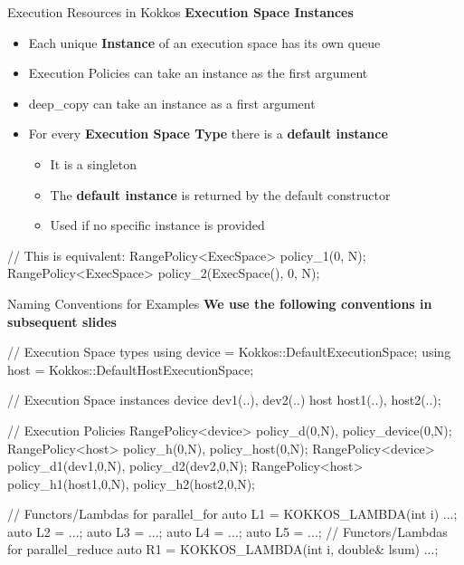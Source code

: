 
\begin{frame}[fragile]{Execution Resources in Kokkos}
\textbf{Execution Space Instances}

\begin{itemize}
  \item{Each unique \textbf{Instance} of an execution space has its own queue}
  \item{Execution Policies can take an instance as the first argument}
  \item{deep\_copy can take an instance as a first argument}
  \item{For every \textbf{Execution Space Type} there is a \textbf{default instance}}
	  \begin{itemize}
		  \item{It is a singleton}
		  \item{The \textbf{default instance} is returned by the default constructor}
		  \item{Used if no specific instance is provided}
	  \end{itemize}
\end{itemize}

\pause
\begin{code}[linebackgroundcolor={},keywords={L1,L2,policy_device}]
// This is equivalent:
RangePolicy<ExecSpace> 
  policy_1(0, N);
RangePolicy<ExecSpace> 
  policy_2(ExecSpace(), 0, N);
\end{code}


\end{frame}


\begin{frame}[fragile]{Naming Conventions for Examples}
\textbf{We use the following conventions in subsequent slides}
\begin{code}[linebackgroundcolor={},keywords={device,host,policy_d,policy_device,policy_h,policy_host,policy_d1,policy_d2,policy_h1,policy_h2}]
// Execution Space types
using device = Kokkos::DefaultExecutionSpace;
using host = Kokkos::DefaultHostExecutionSpace;

// Execution Space instances
device dev1(..), dev2(..)
host host1(..), host2(..);

// Execution Policies
RangePolicy<device> policy_d(0,N), policy_device(0,N);
RangePolicy<host> policy_h(0,N), policy_host(0,N);
RangePolicy<device> policy_d1(dev1,0,N), policy_d2(dev2,0,N);
RangePolicy<host> policy_h1(host1,0,N), policy_h2(host2,0,N);

// Functors/Lambdas for parallel_for
auto L1 = KOKKOS_LAMBDA(int i) {...};
auto L2 = ...; auto L3 = ...; auto L4 = ...; auto L5 = ...;
// Functors/Lambdas for parallel_reduce
auto R1 = KOKKOS_LAMBDA(int i, double& lsum) {...};
\end{code}
\end{frame}

